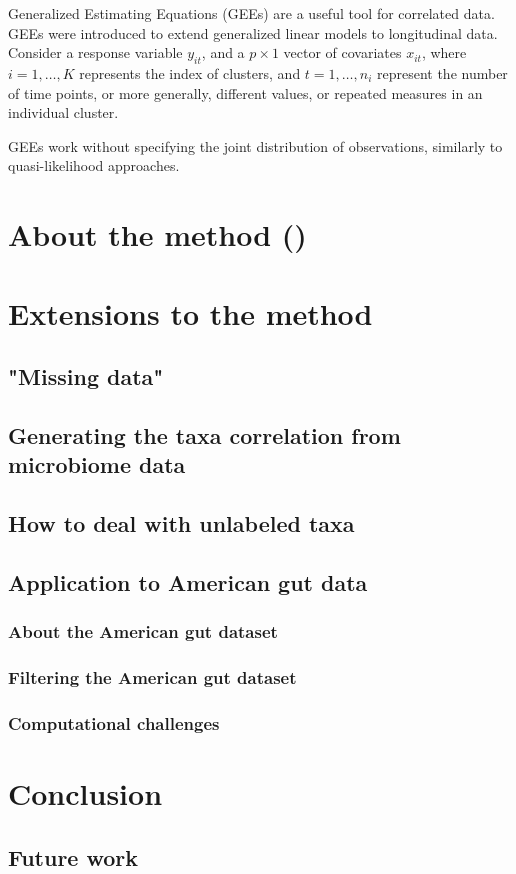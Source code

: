 \documentclass[12pt]{article}
\begin{document}
Generalized Estimating Equations (GEEs) are a useful tool for correlated data. GEEs were introduced to extend generalized linear models to longitudinal data. \cite{liang1986longitudinal} Consider a response variable $y_{it}$, and a $p \times 1$ vector of covariates $x_{it}$, where $i = 1, \ldots , K$ represents the index of clusters, and $t = 1, \ldots , n_i$ represent the number of time points, or more generally, different values, or repeated measures in an individual cluster.

GEEs work without specifying the joint distribution of observations, similarly to quasi-likelihood approaches.







\section{About the method ()}
\cite{chen2020generalized}


\section{Extensions to the method}
\subsection{"Missing data"}
\subsection{Generating the taxa correlation from microbiome data}
\subsection{How to deal with unlabeled taxa}
\subsection{Application to American gut data}
\subsubsection{About the American gut dataset}
\subsubsection{Filtering the American gut dataset}
\subsubsection{Computational challenges}


\section{Conclusion}
\subsection{Future work}







\printbibliography
\end{document}
